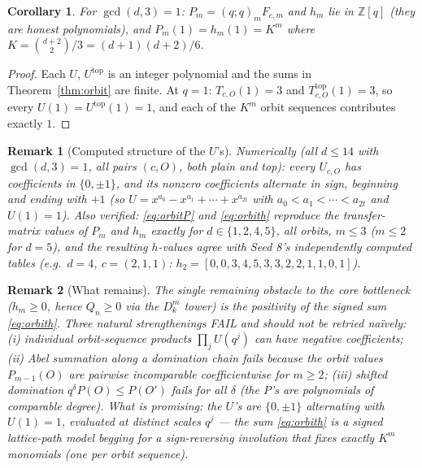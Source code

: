 \documentclass[11pt]{article}
\newtheorem{corollary}{Corollary}
\newtheorem{remark}{Remark}
\begin{document}
\begin{corollary}\label{cor:poly}
For $\gcd(d,3)=1$: $P_m = (q;q)_m F_{c,m}$ and $h_m$ lie in $\mathbb{Z}[q]$ (they are honest
polynomials), and $P_m(1) = h_m(1) = K^m$ where $K=\binom{d+2}{2}/3 = (d+1)(d+2)/6$.
\end{corollary}

\begin{proof}
Each $U$, $U^{\mathrm{top}}$ is an integer polynomial and the sums in
Theorem~\ref{thm:orbit} are finite. At $q=1$: $T_{c,O}(1)=3$ and $T^{\mathrm{top}}_{c,O}(1)=3$,
so every $U(1) = U^{\mathrm{top}}(1) = 1$, and each of the $K^m$ orbit sequences contributes
exactly $1$.
\end{proof}

\begin{remark}[Computed structure of the $U$'s]
Numerically (all $d\le 14$ with $\gcd(d,3)=1$, all pairs $(c,O)$, both plain and top):
every $U_{c,O}$ has coefficients in $\{0,\pm1\}$, and its nonzero coefficients alternate in
sign, beginning and ending with $+1$ (so $U = x^{a_0}-x^{a_1}+\cdots+x^{a_{2t}}$ with
$a_0<a_1<\cdots<a_{2t}$ and $U(1)=1$). Also verified: \eqref{eq:orbitP} and \eqref{eq:orbith}
reproduce the transfer-matrix values of $P_m$ and $h_m$ exactly for $d\in\{1,2,4,5\}$,
all orbits, $m\le 3$ ($m\le 2$ for $d=5$), and the resulting $h$-values agree with Seed 8's
independently computed tables (e.g.\ $d=4$, $c=(2,1,1)$: $h_2 = [0,0,3,4,5,3,3,2,2,1,1,0,1]$).
\end{remark}

\begin{remark}[What remains]
The single remaining obstacle to the core bottleneck ($h_m\ge0$, hence
$Q_n\ge 0$ via the $D_k^m$ tower) is the positivity of the signed sum \eqref{eq:orbith}.
Three natural strengthenings FAIL and should not be retried na\"ively:
(i) individual orbit-sequence products $\prod_j U(q^j)$ can have negative coefficients;
(ii) Abel summation along a domination chain fails because the orbit values
$P_{m-1}(O)$ are pairwise incomparable coefficientwise for $m\ge 2$;
(iii) shifted domination $q^\delta P(O) \le P(O')$ fails for all $\delta$ (the $P$'s are
polynomials of comparable degree). What is promising: the $U$'s are $\{0,\pm1\}$
alternating with $U(1)=1$, evaluated at distinct scales $q^j$ --- the sum \eqref{eq:orbith}
is a signed lattice-path model begging for a sign-reversing involution that fixes exactly
$K^m$ monomials (one per orbit sequence).
\end{remark}
\end{document}
